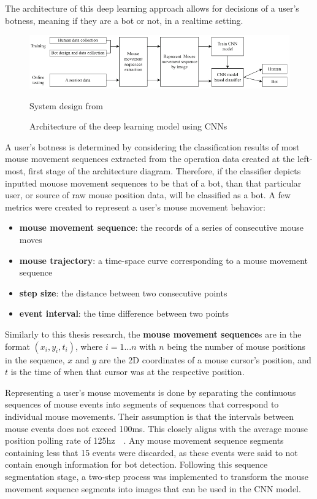 The architecture of this deep learning approach allows for decisions of a user's botness, meaning if they are a bot or not, in a realtime setting.
\begin{figure}[!h]
    \includegraphics[width=1\columnwidth]{figures/deep_learning_with_mouse_dynamics_system_architecture}
    \caption{Architecture of the deep learning model using CNNs}
    {\small System design from~\cite{deep_learning_detection_with_mouse_behavior}}
    \label{fig:deep-learning-architecture}
\end{figure}
A user's botness is determined by considering the classification results of most mouse movement sequences extracted from the operation data created at the left-most, first stage of the architecture diagram.
Therefore, if the classifier depicts inputted mouose movement sequences to be that of a bot, than that particular user, or source of raw mouse position data, will be classified as a bot.
A few metrics were created to represent a user's mouse movement behavior:
\begin{itemize}
    \item \textbf{mouse movement sequence}: the records of a series of consecutive mouse moves
    \item \textbf{mouse trajectory}: a time-space curve corresponding to a mouse movement sequence
    \item \textbf{step size}: the distance between two consecutive points
    \item \textbf{event interval}: the time difference between two points
\end{itemize}
Similarly to this thesis research, the \textbf{mouse movement sequence}s are in the format $(x_i, y_i, t_i)$, where $i = 1{\dots}n$ with $n$ being the number of mouse positions in the sequence, $x$ and $y$ are the 2D coordinates of a mouse cursor's position, and $t$ is the time of when that cursor was at the respective position.

Representing a user's mouse movements is done by separating the continuous sequences of mouse events into segments of sequences that correspond to individual mouse movements.
Their assumption is that the intervals between mouse events does not exceed 100ms.
This closely aligns with the average mouse position polling rate of 125hz~\cite{mouse_dpi_and_polling_rate_explained}~\cite{mouse_dpi_and_usb_polling_rate}.
Any mouse movement sequence segments containing less that 15 events were discarded, as these events were said to not contain enough information for bot detection.
Following this sequence segmentation stage, a two-step process was implemented to transform the mouse movement sequence segments into images that can be used in the CNN model.

